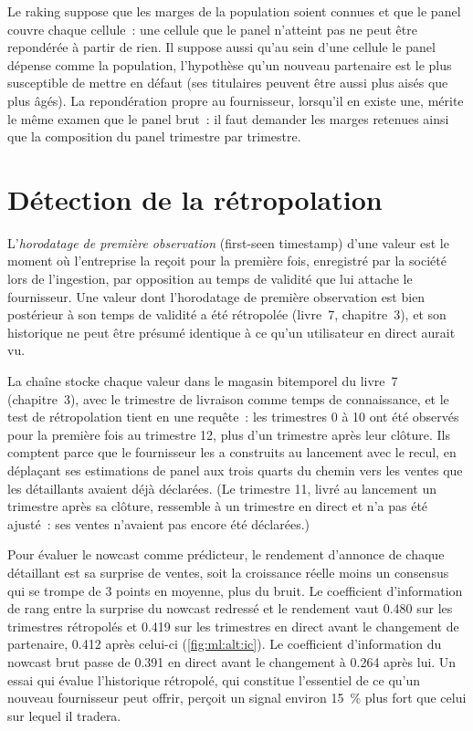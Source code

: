Le raking suppose que les marges de la population soient connues et que le panel couvre chaque cellule~: une cellule que le panel n'atteint pas ne peut
être repondérée à partir de rien. Il suppose aussi qu'au sein d'une cellule le panel dépense comme la population, l'hypothèse
qu'un nouveau partenaire est le plus susceptible de mettre en défaut (ses titulaires peuvent être aussi plus aisés que plus âgés). La
repondération propre au fournisseur, lorsqu'il en existe une, mérite le même examen que le panel brut~: il faut demander les marges retenues ainsi que la
composition du panel trimestre par trimestre.

\section{Détection de la rétropolation}

\begin{definition}\label{def:ml:alternative-data-pipelines:firstseen}
L'\emph{horodatage de première observation} (first-seen timestamp) d'une valeur est le moment où l'entreprise la reçoit pour la première fois, enregistré par
la société lors de l'ingestion, par opposition au temps de validité que lui attache le fournisseur. Une valeur dont l'horodatage de première observation est bien
postérieur à son temps de validité a été rétropolée (livre~7, chapitre~3), et son historique ne peut être présumé identique à ce qu'un utilisateur
en direct aurait vu.
\end{definition}

La chaîne stocke chaque valeur dans le magasin bitemporel du livre~7 (chapitre~3), avec le trimestre de livraison comme temps de connaissance,
et le test de rétropolation tient en une requête~: les trimestres 0 à 10 ont été observés pour la première fois au trimestre 12, plus d'un trimestre après leur clôture.
Ils comptent parce que le fournisseur les a construits au lancement avec le recul, en déplaçant ses estimations de panel aux trois quarts
du chemin vers les ventes que les détaillants avaient déjà déclarées. (Le trimestre 11, livré au lancement un trimestre après sa clôture, ressemble
à un trimestre en direct et n'a pas été ajusté~: ses ventes n'avaient pas encore été déclarées.)

Pour évaluer le nowcast comme prédicteur, le rendement d'annonce de chaque détaillant est sa surprise de ventes, soit la croissance réelle moins un
consensus qui se trompe de 3 points en moyenne, plus du bruit. Le coefficient d'information de rang entre la surprise du nowcast redressé
et le rendement vaut 0.480 sur les trimestres rétropolés et 0.419 sur les trimestres en direct avant le changement de partenaire, 0.412
après celui-ci (\cref{fig:ml:alt:ic}). Le coefficient d'information du nowcast brut passe de 0.391 en direct avant le changement à 0.264 après lui. Un essai
qui évalue l'historique rétropolé, qui constitue l'essentiel de ce qu'un nouveau fournisseur peut offrir, perçoit un signal environ 15~\% plus fort que
celui sur lequel il tradera.


